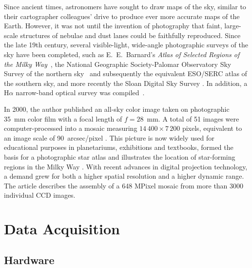 \documentclass[preprint]{aastex}
\begin{document}
Since ancient times, astronomers have sought to draw maps of the sky, similar to their cartographer colleagues' drive to produce ever more accurate maps of the Earth. 
However, it was not until the invention of photography that faint, large-scale structures of nebulae and dust lanes could be faithfully reproduced. Since the late 19th century, several visible-light, wide-angle photographic surveys of the sky have been completed, such as E.~E.~Barnard's \textit{Atlas of Selected Regions of the Milky Way}~\citep{Bar1927}, the National Geographic Society-Palomar Observatory Sky Survey of the northern sky~\citep{Min1963} and subsequently the equivalent ESO/SERC atlas of the southern sky, and more recently the Sloan Digital Sky Survey \citep{York2000}. In addition, a H$\alpha$ narrow-band optical survey was compiled~\citep{Fin2003}.



In 2000, the author published an all-sky color image taken on photographic 35~mm color film with a focal length of $f=28$~mm. A total of 51 images were computer-processed into a mosaic measuring $14\,400\times 7\,200$ pixels, equivalent to an image scale of 90~arcsec/pixel \citep{diCicco1999,Kiz2001}. This picture is now widely used for educational purposes in planetariums, exhibitions and textbooks, formed the basis for a photographic star atlas \citep{Mel2005} and illustrates the location of star-forming regions in the Milky Way \citep{Mel2008}.
With recent advances in digital projection technology, a demand grew for both a higher spatial resolution and a higher dynamic range. The article describes the assembly of a 648 MPixel mosaic from more than 3000 individual CCD images.

\section{Data Acquisition}
\subsection{Hardware}
\end{document}
